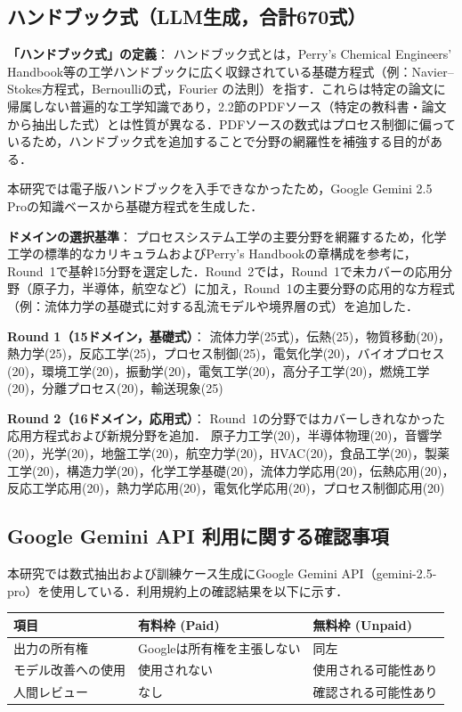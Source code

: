 \documentclass[11pt,a4paper]{ltjsarticle}
\begin{document}
\subsection{ハンドブック式（LLM生成，合計670式）}

\textbf{「ハンドブック式」の定義}：
ハンドブック式とは，Perry's Chemical Engineers' Handbook等の工学ハンドブックに広く収録されている基礎方程式（例：Navier--Stokes方程式，Bernoulliの式，Fourier の法則）を指す．これらは特定の論文に帰属しない普遍的な工学知識であり，2.2節のPDFソース（特定の教科書・論文から抽出した式）とは性質が異なる．PDFソースの数式はプロセス制御に偏っているため，ハンドブック式を追加することで分野の網羅性を補強する目的がある．

本研究では電子版ハンドブックを入手できなかったため，Google Gemini 2.5 Proの知識ベースから基礎方程式を生成した．

\textbf{ドメインの選択基準}：
プロセスシステム工学の主要分野を網羅するため，化学工学の標準的なカリキュラムおよびPerry's Handbookの章構成を参考に，Round~1で基幹15分野を選定した．Round~2では，Round~1で未カバーの応用分野（原子力，半導体，航空など）に加え，Round~1の主要分野の応用的な方程式（例：流体力学の基礎式に対する乱流モデルや境界層の式）を追加した．

\textbf{Round 1（15ドメイン，基礎式）}：
流体力学(25式)，伝熱(25)，物質移動(20)，熱力学(25)，反応工学(25)，プロセス制御(25)，電気化学(20)，バイオプロセス(20)，環境工学(20)，振動学(20)，電気工学(20)，高分子工学(20)，燃焼工学(20)，分離プロセス(20)，輸送現象(25)

\textbf{Round 2（16ドメイン，応用式）}：
Round~1の分野ではカバーしきれなかった応用方程式および新規分野を追加．
原子力工学(20)，半導体物理(20)，音響学(20)，光学(20)，地盤工学(20)，航空力学(20)，HVAC(20)，食品工学(20)，製薬工学(20)，構造力学(20)，化学工学基礎(20)，流体力学応用(20)，伝熱応用(20)，反応工学応用(20)，熱力学応用(20)，電気化学応用(20)，プロセス制御応用(20)

\subsection{Google Gemini API 利用に関する確認事項}

本研究では数式抽出および訓練ケース生成にGoogle Gemini API（gemini-2.5-pro）を使用している．利用規約上の確認結果を以下に示す．

\begin{table}[h]
\centering
\begin{tabular}{lll}
\toprule
項目 & 有料枠 (Paid) & 無料枠 (Unpaid) \\
\midrule
出力の所有権 & Googleは所有権を主張しない & 同左 \\
モデル改善への使用 & 使用されない & 使用される可能性あり \\
人間レビュー & なし & 確認される可能性あり \\
\bottomrule
\end{tabular}
\end{table}
\end{document}
